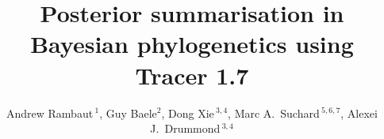 \documentclass{bioinfo}
\begin{document}

\title[Tracer 1.7]{Posterior summarisation in Bayesian phylogenetics using Tracer 1.7}

\author[Rambaut \textit{et~al.}]{ Andrew Rambaut\,$^{1}$, Guy Baele$^{2}$,  Dong Xie\,$^{3,4}$, Marc A.~Suchard\,$^{5,6,7}$, Alexei J.~Drummond\,$^{3,4}$}

\address{
$^{1}$Institute of Evolutionary Biology, University of Edinburgh, Edinburgh, UK\\
$^{2}$Department of Microbiology and Immunology, Rega Institute, KU Leuven, Leuven, Belgium\\
$^{3}$Department of Computer Science, University of Auckland, Auckland, NZ\\
$^{4}$Centre for Computational Evolution, University of Auckland, Auckland, NZ\\
$^{5}$Departments of Biomathematics and Human Genetics, David Geffen School of Medicine, University of California, Los Angeles, USA \\
$^{6}$Department of Biostatistics, UCLA Fielding School of Public Health, University of California, Los Angeles, USA \\
$^{7}$Department of Human Genetics, David Geffen School of Medicine at UCLA, University of California, Los Angeles, USA\\
}



\maketitle
\end{document}
